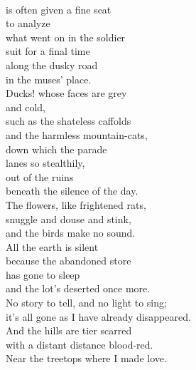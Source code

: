 \documentclass[smalldemyvopaper,11pt,twoside,onecolumn,openright,extrafontsizes]{memoir}
\begin{document}
\\is often given a fine seat
\\to analyze
\\what went on in the soldier
\\suit for a final time
\\along the dusky road
\\in the muses' place.
\\Ducks! whose faces are grey
\\and cold,
\\such as the shateless caffolds
\\and the harmless mountain-cats,
\\down which the parade
\\lanes so stealthily,
\\out of the ruins
\\beneath the silence of the day.
\\The flowers, like frightened rats,
\\snuggle and douse and stink,
\\and the birds make no sound.
\\All the earth is silent
\\because the abandoned store
\\has gone to sleep
\\and the lot's deserted once more.
\\No story to tell, and no light to sing;
\\it's all gone as I have already disappeared.
\\And the hills are tier scarred
\\with a distant distance blood-red.
\\Near the treetops where I made love.
\end{document}
